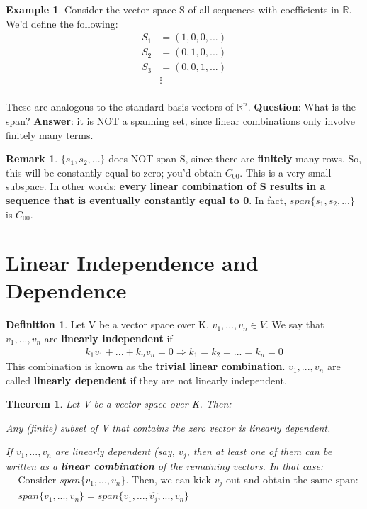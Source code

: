 \documentclass[a4paper, 12pt]{article}
\newtheorem{theorem}{Theorem}
\theoremstyle{definition}
\newtheorem{exmp}{Example}[section]
\theoremstyle{definition}
\newtheorem{defn}{Definition}[section]
\theoremstyle{definition}
\theoremstyle{definition}
\newtheorem{rmk}{Remark}[section]
\newenvironment{enumerate_tight}{
	\begin{enumerate}
		\setlength{\itemsep}{0pt}
		\setlength{\parskip}{0pt}
	}{\end{enumerate}}
\begin{document}
{\begin{exmp}
	Consider the vector space S of all sequences with coefficients in $\mathbb{R}$. We'd define the following: 
	\begin{align*}
		S_1 & = (1,0,0,...) \\
		S_2 & = (0,1,0,...) \\
		S_3 & = (0,0,1,...) \\
		& \vdots \\
	\end{align*}
\end{exmp}
These are analogous to the standard basis vectors of $\mathbb{R}^n$. \textbf{Question}: What is the span? \textbf{Answer}: it is NOT a spanning set, since linear combinations only involve finitely many terms. 
\begin{rmk}
	$\{ s_1, s_2, ... \}$ does NOT span S, since there are \textbf{finitely} many rows. So, this will be constantly equal to zero; you'd obtain $C_{00}$. This is a very small subspace. In other words: \textbf{every linear combination of S results in a sequence that is eventually constantly equal to 0}. In fact, $span \{ s_1, s_2, ... \}$ is $C_{00}$. 
\end{rmk}

\section{Linear Independence and Dependence}
\begin{defn}
	Let V be a vector space over K, $v_1,..., v_n \in V$. We say that $v_1, ...,v_n$ are \textbf{linearly independent} if 
	\begin{align}
		k_1 v_1 + ... + k_n v_n = 0 \Rightarrow k_1 = k_2 = ... = k_n = 0
	\end{align}
	This combination is known as the \textbf{trivial linear combination}.  $v_1, ..., v_n$ are called \textbf{linearly dependent} if they are not linearly independent. 
\end{defn}

\begin{theorem}
	Let V be a vector space over K. Then: 
	\begin{enumerate_tight}
		\item Any (finite) subset of V that contains the zero vector is linearly dependent. 
		\item If $v_1,...,v_n$ are linearly dependent (say, $v_j$, then at least one of them can be written as a \textbf{linear combination} of the remaining vectors. In that case:
		\begin{align*}
			& \mbox{Consider $span \{ v_1, ..., v_n \}$. Then, we can kick $v_j$ out and obtain the same span:} \\
				& span \{ v_1, ..., v_n \} = span \{ v_1, ..., \hat{v_j}, ..., v_n \}  
		\end{align*}
	\end{enumerate_tight}
\end{theorem}

}
\end{document}
